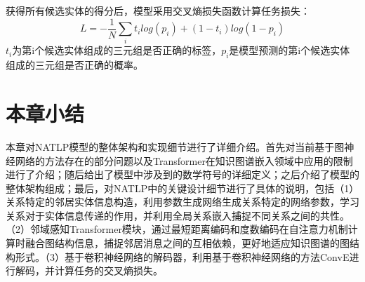 获得所有候选实体的得分后，模型采用交叉熵损失函数计算任务损失：
\begin{equation}
  L = -\frac{1}{N}\sum\limits_{i}t_ilog(p_i)+(1-t_i)log(1-p_i)
\end{equation}
$t_i$为第i个候选实体组成的三元组是否正确的标签，$p_i$是模型预测的第i个候选实体组成的三元组是否正确的概率。


\section{本章小结}

本章对NATLP模型的整体架构和实现细节进行了详细介绍。首先对当前基于图神经网络的方法存在的部分问题以及Transformer在知识图谱嵌入领域中应用的限制进行了介绍；随后给出了模型中涉及到的数学符号的详细定义；之后介绍了模型的整体架构组成；最后，对NATLP中的关键设计细节进行了具体的说明，包括（1）关系特定的邻居实体信息构造，利用参数生成网络生成关系特定的网络参数，学习关系对于实体信息传递的作用，并利用全局关系嵌入捕捉不同关系之间的共性。（2）邻域感知Transformer模块，通过最短距离编码和度数编码在自注意力机制计算时融合图结构信息，捕捉邻居消息之间的互相依赖，更好地适应知识图谱的图结构形式。（3）基于卷积神经网络的解码器，利用基于卷积神经网络的方法ConvE进行解码，并计算任务的交叉熵损失。